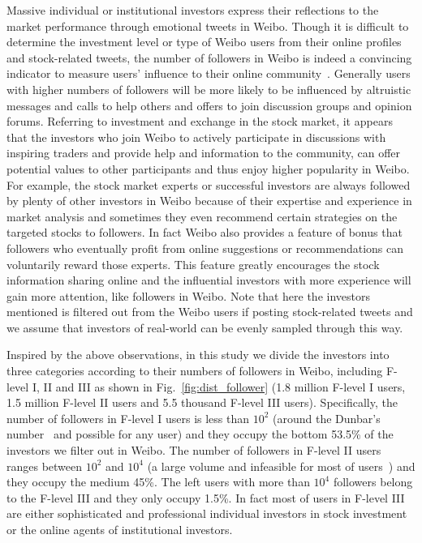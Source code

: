 \documentclass[aps,preprint,groupedaddress]{revtex4-1}
\begin{document}
Massive individual or institutional investors express their reflections to the market performance through emotional tweets in Weibo. Though it is difficult to determine the investment level or type of Weibo users from their online profiles and stock-related tweets, the number of followers in Weibo is indeed a convincing indicator to measure users' influence to their online community~\cite{icwsm10cha,zhang2012motivations,networkeffect}. Generally{\color{black}{,}} users with higher numbers of followers will be more likely to be influenced by altruistic messages and calls to help others and offers to join discussion groups and opinion forums. Referring to investment and exchange in the stock market, it appears that the investors who join Weibo to actively participate in discussions with inspiring traders and provide help and information to the community, can offer potential values to other participants and thus enjoy higher popularity in Weibo. For example, the stock market experts or successful investors are always followed by plenty of other investors in Weibo because of their expertise and experience in market analysis and sometimes they even recommend certain strategies on the targeted stocks to followers. In fact{\color{black}{,}} Weibo also provides a feature of bonus that followers who eventually profit from online suggestions or recommendations can voluntarily reward those experts. This feature greatly encourages the stock information sharing online and the influential investors with more experience will gain more attention, like followers in Weibo. Note that here the investors mentioned is filtered out from the Weibo users if posting stock-related tweets and we assume that investors of real-world can be evenly sampled through this way{\color{black}{, especially considering the vast number of Weibo users}}.

Inspired by the above observations, in this study we divide the investors into three categories according to their numbers of followers in Weibo, including F-level I, II and III as shown in Fig.~\ref{fig:dist_follower} (1.8 million F-level I users, 1.5 million F-level II users and 5.5 thousand F-level III users). Specifically, the number of followers in F-level I users is less than $10^2$ (around the Dunbar's number~\cite{dunbarnumber} and possible for any user) and they occupy the bottom 53.5\% of the investors we filter out in Weibo. The number of followers in F-level II users ranges between $10^2$ and $10^4$ (a large volume and infeasible for most of users~\cite{guo2011sina}) and they occupy the medium 45\%. {\color{black}{We consider that most of F-level I and F-level II users are inexperienced ordinary investors.}} The left users with more than $10^4$ followers belong to the F-level III and they only occupy 1.5\%. In fact{\color{black}{,}} most of users in F-level III are either sophisticated and professional individual investors in stock investment or the online agents of institutional investors.
\end{document}
